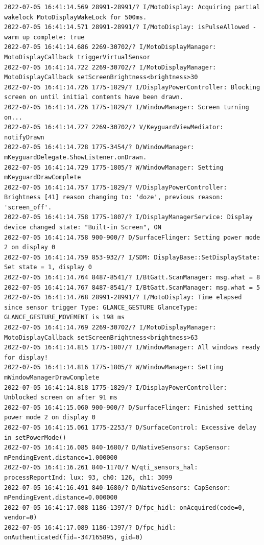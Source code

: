\documentclass[a4paper,12pt]{book}
\begin{document}
\begin{lstlisting}
2022-07-05 16:41:14.569 28991-28991/? I/MotoDisplay: Acquiring partial wakelock MotoDisplayWakeLock for 500ms.
2022-07-05 16:41:14.571 28991-28991/? I/MotoDisplay: isPulseAllowed - warm up complete: true
2022-07-05 16:41:14.686 2269-30702/? I/MotoDisplayManager: MotoDisplayCallback triggerVirtualSensor
2022-07-05 16:41:14.722 2269-30702/? I/MotoDisplayManager: MotoDisplayCallback setScreenBrightness<brightness>30
2022-07-05 16:41:14.726 1775-1829/? I/DisplayPowerController: Blocking screen on until initial contents have been drawn.
2022-07-05 16:41:14.726 1775-1829/? I/WindowManager: Screen turning on...
2022-07-05 16:41:14.727 2269-30702/? V/KeyguardViewMediator: notifyDrawn
2022-07-05 16:41:14.728 1775-3454/? D/WindowManager: mKeyguardDelegate.ShowListener.onDrawn.
2022-07-05 16:41:14.729 1775-1805/? W/WindowManager: Setting mKeyguardDrawComplete
2022-07-05 16:41:14.757 1775-1829/? V/DisplayPowerController: Brightness [41] reason changing to: 'doze', previous reason: 'screen_off'.
2022-07-05 16:41:14.758 1775-1807/? I/DisplayManagerService: Display device changed state: "Built-in Screen", ON
2022-07-05 16:41:14.758 900-900/? D/SurfaceFlinger: Setting power mode 2 on display 0
2022-07-05 16:41:14.759 853-932/? I/SDM: DisplayBase::SetDisplayState: Set state = 1, display 0
2022-07-05 16:41:14.764 8487-8541/? I/BtGatt.ScanManager: msg.what = 8
2022-07-05 16:41:14.767 8487-8541/? I/BtGatt.ScanManager: msg.what = 5
2022-07-05 16:41:14.768 28991-28991/? I/MotoDisplay: Time elapsed since sensor trigger Type: GLANCE_GESTURE GlanceType: GLANCE_GESTURE_MOVEMENT is 198 ms
2022-07-05 16:41:14.769 2269-30702/? I/MotoDisplayManager: MotoDisplayCallback setScreenBrightness<brightness>63
2022-07-05 16:41:14.815 1775-1807/? I/WindowManager: All windows ready for display!
2022-07-05 16:41:14.816 1775-1805/? W/WindowManager: Setting mWindowManagerDrawComplete
2022-07-05 16:41:14.818 1775-1829/? I/DisplayPowerController: Unblocked screen on after 91 ms
2022-07-05 16:41:15.060 900-900/? D/SurfaceFlinger: Finished setting power mode 2 on display 0
2022-07-05 16:41:15.061 1775-2253/? D/SurfaceControl: Excessive delay in setPowerMode()
2022-07-05 16:41:16.085 840-1680/? D/NativeSensors: CapSensor:  mPendingEvent.distance=1.000000
2022-07-05 16:41:16.261 840-1170/? W/qti_sensors_hal: processReportInd: lux: 93, ch0: 126, ch1: 3099
2022-07-05 16:41:16.491 840-1680/? D/NativeSensors: CapSensor:  mPendingEvent.distance=0.000000
2022-07-05 16:41:17.088 1186-1397/? D/fpc_hidl: onAcquired(code=0, vendor=0)
2022-07-05 16:41:17.089 1186-1397/? D/fpc_hidl: onAuthenticated(fid=-347165895, gid=0)

\end{lstlisting}
\end{document}
